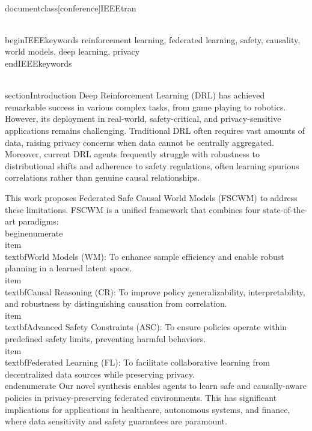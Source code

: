 \\documentclass[conference]{IEEEtran}
\begin{document}
\\begin{IEEEkeywords}
reinforcement learning, federated learning, safety, causality, world models, deep learning, privacy
\\end{IEEEkeywords}

\\section{Introduction}
Deep Reinforcement Learning (DRL) has achieved remarkable success in various complex tasks, from game playing to robotics. However, its deployment in real-world, safety-critical, and privacy-sensitive applications remains challenging. Traditional DRL often requires vast amounts of data, raising privacy concerns when data cannot be centrally aggregated. Moreover, current DRL agents frequently struggle with robustness to distributional shifts and adherence to safety regulations, often learning spurious correlations rather than genuine causal relationships.

This work proposes Federated Safe Causal World Models (FSCWM) to address these limitations. FSCWM is a unified framework that combines four state-of-the-art paradigms:
\\begin{enumerate}
    \\item \\textbf{World Models (WM)}: To enhance sample efficiency and enable robust planning in a learned latent space.
    \\item \\textbf{Causal Reasoning (CR)}: To improve policy generalizability, interpretability, and robustness by distinguishing causation from correlation.
    \\item \\textbf{Advanced Safety Constraints (ASC)}: To ensure policies operate within predefined safety limits, preventing harmful behaviors.
    \\item \\textbf{Federated Learning (FL)}: To facilitate collaborative learning from decentralized data sources while preserving privacy.
\\end{enumerate}
Our novel synthesis enables agents to learn safe and causally-aware policies in privacy-preserving federated environments. This has significant implications for applications in healthcare, autonomous systems, and finance, where data sensitivity and safety guarantees are paramount.
\end{document}
